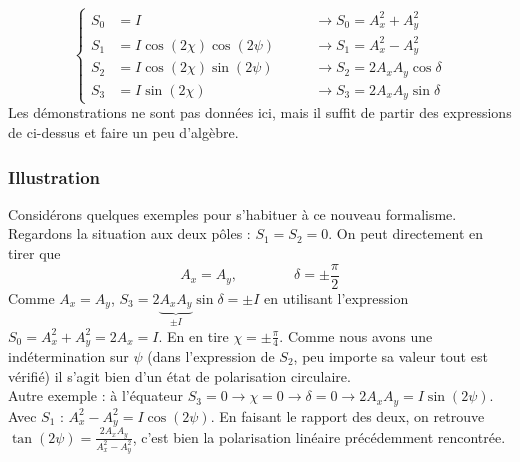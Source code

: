  	\begin{equation}
	\left\{\begin{array}{lll}
	S_0 &= I&\qquad\rightarrow S_0 = A_x^2+A_y^2\\
 	S_1 &= I\cos(2\chi)\cos(2\psi)&\qquad\rightarrow S_1 = A_x^2-A_y^2\\
 	S_2 &= I\cos(2\chi)\sin(2\psi)&\qquad\rightarrow S_2 = 2A_xA_y\cos\delta\\
 	S_3 &= I\sin(2\chi)&\qquad\rightarrow S_3 = 2A_xA_y\sin\delta
	\end{array}\right.
 	\end{equation}
 	Les démonstrations ne sont pas données ici, mais il suffit de partir des expressions de 
 	ci-dessus et faire un peu d'algèbre.
 	
 		\subsubsection{Illustration}
 		Considérons quelques exemples pour s'habituer à ce nouveau formalisme. Regardons la 
 		situation aux deux pôles : $S_1=S_2=0$. On peut directement en tirer que
 		\begin{equation}
 		A_x = A_y,\qquad\qquad \delta = \pm\frac{\pi}{2}
 		\end{equation}
		Comme $A_x=A_y$, $S_3 = 2\underbrace{A_xA_y}_{\pm I}\sin\delta = \pm I$ en utilisant 
		l'expression $S_0 = A_x^2+A_y^2 = 2A_x = I$. En en tire $\chi = \pm \frac{\pi}{4}$. 
		Comme nous avons une indétermination sur $\psi$ (dans l'expression de $S_2$, peu 
		importe sa valeur tout est vérifié) il s'agit bien d'un état de polarisation circulaire. \\
		
		Autre exemple : à l'équateur $S_3=0 \rightarrow \chi = 0 \rightarrow \delta = 0\rightarrow 	
		2A_xA_y=I\sin(2\psi)$. Avec $S_1$ : $A_x^2-A_y^2 = I\cos(2\psi)$. En faisant le rapport des 
		deux, on retrouve $\tan(2\psi)=\frac{2A_xA_y}{A_x^2-A_y^2}$, c'est bien la polarisation 
		linéaire précédemment rencontrée.
		
